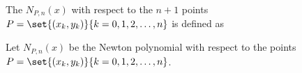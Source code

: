 \begin{definition}
\label{def:Nn(x)}
The  $N_{P,n}(x)$ with respect to the $n+1$ points\\
$P=\set{(x_k,y_k)}{k=0,1,2,\ldots,n}$ is defined as
\end{definition}


\begin{proposition}
Let $N_{P,n}(x)$ be the Newton polynomial with respect to the points\\
$P=\set{(x_k,y_k)}{k=0,1,2,\ldots,n}$.
\end{proposition}

